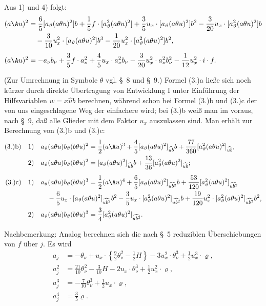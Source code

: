 Aus 1) und 4) folgt:
\[
\begin{aligned}
(a\A u)^2
&=\frac65[a_\vartheta(a\theta u)^2]b+\frac15f\cdot[a_\vartheta^2(a\theta u)^2]+\frac35u_x\cdot[a_\vartheta(a\theta u)^2]b^2-\frac3{20}u_x\cdot[a_\vartheta^2(a\theta u)^2]b\\
&\quad-\frac3{10}u_x^2\cdot[a_\vartheta(a\theta u)^2]b^3-\frac1{20}u_x^2\cdot[a_\vartheta^2(a\theta u)^2]b^2,\\[0.4em]
(a\A u)^2&=-a_\nu b_\nu+\frac35f\cdot a_\nu^2+\frac45u_x\cdot a_\nu^2b_\nu-\frac3{20}u_x^2\cdot a_\nu^2b_\nu^2-\frac1{12}u_x^2\cdot i\cdot f.
\end{aligned}
\]

(Zur Umrechnung in Symbole $\theta$ vgl. \S\ 8 und \S\ 9.)
Formel (3.)a ließe sich noch kürzer durch direkte Übertragung von Entwicklung I unter Einführung der Hilfsvariablen $w=x\widehat{u}b$ berechnen, während schon bei Formel (3.)b und (3.)c der von uns eingeschlagene Weg der einfachere wird; bei (3.)b weiß man im voraus, nach \S\ 9, daß alle Glieder mit dem Faktor $u_x$ auszulassen sind. Man erhält zur Berechnung von (3.)b und (3.)c:
\[
\begin{aligned}
(3.)\mathrm{b)}\quad 1)&\quad a_\vartheta(a\theta u)b_\vartheta(b\theta u)^2=\frac12(a\A u)^3+\frac45[a_\vartheta(a\theta u)^2]_{\widehat{ub}}b+\frac{77}{360}[a_\vartheta^2(a\theta u)^2]_{\widehat{ub}},\\
2)&\quad a_\vartheta(a\theta u)b_\vartheta(b\theta u)^2=[a_\vartheta(a\theta u)^2]_{\widehat{ub}}b+\frac{13}{36}[a_\vartheta^2(a\theta u)^2]_{\widehat{ub}};\\[0.5em]
(3.)\mathrm{c)}\quad 1)&\quad a_\vartheta(a\theta u)b_\vartheta(b\theta u)^3=\frac12(a\A u)^4+\frac65[a_\vartheta(a\theta u)^2]_{\widehat{ub^2}}b+\frac{53}{120}[a_\vartheta^2(a\theta u)^2]_{\widehat{ub^2}}\\
&\qquad-\frac65u_x\cdot[a_\vartheta(a\theta u)^2]_{\widehat{ub^2}}b^2-\frac35u_x\cdot[a_\vartheta^2(a\theta u)^2]_{\widehat{ub^2}}b+\frac{19}{120}u_x^2\cdot[a_\vartheta^2(a\theta u)^2]_{\widehat{ub^3}}b^2,\\
2)&\quad a_\vartheta(a\theta u)b_\vartheta(b\theta u)^3=\frac34[a_\vartheta^2(a\theta u)^2]_{\widehat{ub^2}}.
\end{aligned}
\]

Nachbemerkung: Analog berechnen sich die nach \S\ 5 reduziblen Überschiebungen von $f$ über $j$. Es wird
\[
\tag{4.}
\begin{aligned}
a_j&=-\theta_\nu+u_x\cdot\left\{\frac92\theta_\nu^2-\frac12H\right\}-3u_x^2\cdot\theta_\nu^3+\frac12u_x^3\cdot\varrho,\\
a_j^2&=\frac{21}{10}\theta_\nu^2-\frac3{10}H-2u_x\cdot\theta_\nu^3+\frac12u_x^2\cdot\varrho,\\
a_j^3&=-\frac7{10}\theta_\nu^3+\frac12u_x\cdot\varrho,\\
a_j^4&=\frac35\varrho.
\end{aligned}
\]

